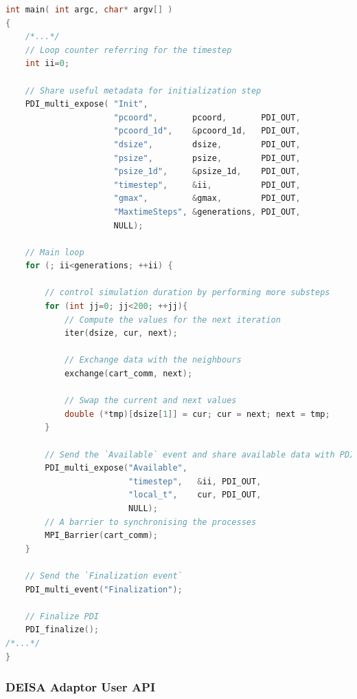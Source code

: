 \begin{lstlisting}[float=h!, label=list:simulation, language=c, caption= Simulation main loop]
int main( int argc, char* argv[] )
{
    /*...*/
    // Loop counter referring for the timestep 
    int ii=0;

    // Share useful metadata for initialization step
    PDI_multi_expose( "Init",
                      "pcoord",       pcoord,       PDI_OUT,
                      "pcoord_1d",    &pcoord_1d,   PDI_OUT,
                      "dsize",        dsize,        PDI_OUT,
                      "psize",        psize,        PDI_OUT, 
                      "psize_1d",     &psize_1d,    PDI_OUT,
                      "timestep",     &ii,          PDI_OUT, 
                      "gmax",         &gmax,        PDI_OUT,
                      "MaxtimeSteps", &generations, PDI_OUT,
                      NULL);

    // Main loop
    for (; ii<generations; ++ii) {

        // control simulation duration by performing more substeps
        for (int jj=0; jj<200; ++jj){       
            // Compute the values for the next iteration
            iter(dsize, cur, next);

            // Exchange data with the neighbours
            exchange(cart_comm, next);

            // Swap the current and next values
            double (*tmp)[dsize[1]] = cur; cur = next; next = tmp;
        }

        // Send the `Available` event and share available data with PDI 
        PDI_multi_expose("Available",
                         "timestep",   &ii, PDI_OUT,
                         "local_t",    cur, PDI_OUT,
                         NULL);
        // A barrier to synchronising the processes
        MPI_Barrier(cart_comm);
    }

    // Send the `Finalization event` 
    PDI_multi_event("Finalization"); 

    // Finalize PDI
    PDI_finalize();
/*...*/
}
\end{lstlisting}

\subsubsection{DEISA Adaptor User API}

